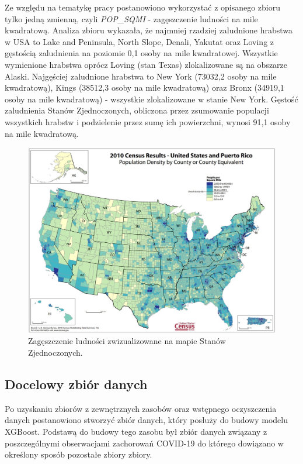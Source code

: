 \documentclass[polish, twoside, 12pt, a4paper]{article}
\theoremstyle{definition}
\theoremstyle{plain}
\theoremstyle{remark}
\begin{document}
Ze względu na tematykę pracy postanowiono wykorzystać z opisanego zbioru tylko jedną zmienną, czyli \emph{POP\_SQMI} - zagęszczenie ludności na mile kwadratową. Analiza zbioru wykazała, że najmniej rzadziej zaludnione hrabstwa w USA to Lake and Peninsula, North Slope, Denali, Yakutat oraz Loving z gęstością zaludnienia na poziomie 0,1 osoby na mile kwadratowej. Wszystkie wymienione hrabstwa oprócz Loving (stan Texas) zlokalizowane są na obszarze Alaski. Najgęściej zaludnione hrabstwa to New York (73032,2 osoby na mile kwadratową), Kings (38512,3 osoby na mile kwadratową) oraz Bronx (34919,1 osoby na mile kwadratową) - wszystkie zlokalizowane w stanie New York. Gęstość zaludnienia Stanów Zjednoczonych, obliczona przez zsumowanie populacji wszystkich hrabstw i podzielenie przez sumę ich powierzchni, wynosi 91,1 osoby na mile kwadratową.

\begin{figure}[H]
\centering
\includegraphics[width=15cm]{us-desity.jpg}
\caption{Zagęszczenie ludności zwizualizowane na mapie Stanów Zjednoczonych. }
\end{figure}

\subsection{Docelowy zbiór danych}

Po uzyskaniu zbiorów z zewnętrznych zasobów oraz wstępnego oczyszczenia danych postanowiono stworzyć zbiór danych, który posłuży do budowy modelu XGBoost. Podstawą do budowy tego zasobu był zbiór danych związany z poszczególnymi obserwacjami zachorowań COVID-19 do którego dowiązano w określony sposób pozostałe zbiory zbiory.
\end{document}
